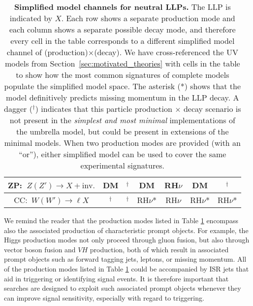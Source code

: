 \begin{table}
\begin{center}
\begin{tabular}{ |c|c|c|c|c|c|c| }
 \hline 
 ZP:~$Z(Z')\rightarrow X+\mathrm{inv.}$ & DM  & ${}^\dagger$ & DM &  RH$\nu$ & DM & ${}^\dagger$\\
  \hline
   CC:~$W(W')\rightarrow \ell X$ & ${}^\dagger$  & ${}^\dagger$ & RH$\nu$* & RH$\nu$ & RH$\nu$* & RH$\nu$* \\
  \hline
\end{tabular}
%
\end{center}
\caption{{\bf Simplified model channels for neutral LLPs.} The LLP is indicated by $X$. Each row shows a separate production mode and each column shows a separate possible decay mode, and therefore every cell in the table corresponds to a different simplified model channel of (production)$\times$(decay). We have cross-referenced the UV models from Section~\ref{sec:motivated_theories} with cells in the table to show how the most common signatures of complete models populate the simplified model space. The asterisk (*) shows that the model definitively predicts missing momentum in the LLP decay. A dagger (${}^\dagger$) indicates that this particle production $\times$ decay scenario is not present in the \emph{simplest and most minimal} implementations of the umbrella model, but could be present in extensions of the minimal models. When two production modes are provided (with an ``or''), either simplified model can be used to cover the same experimental signatures.  }\label{tab:neutral_LLP}
\end{table}

We remind the reader that the production modes listed in Table
\ref{tab:neutral_LLP} encompass also the associated production of
characteristic prompt objects. For example, the Higgs production modes
not only proceed through gluon fusion, but also through vector boson
fusion and $VH$ production, both of which result in associated prompt
objects such as forward tagging jets, leptons, or missing
momentum. All of the production modes listed in Table
\ref{tab:neutral_LLP} could be accompanied by ISR jets that aid in
triggering or identifying signal events. It is therefore important
that searches are designed to exploit such associated prompt objects
whenever they can improve signal sensitivity, especially with regard to triggering.

